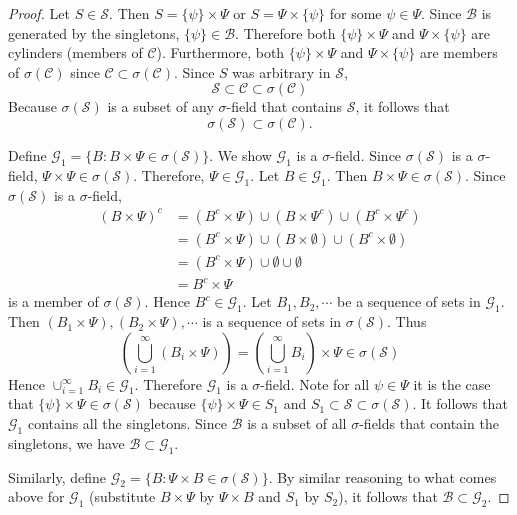 \documentclass[letterpaper, 12pt]{article}
\newcommand{\cB}{\mathcal{B}}
\newcommand{\cC}{\mathcal{C}}
\newcommand{\cG}{\mathcal{G}}
\newcommand{\cS}{\mathcal{S}}
\begin{document}
\begin{enumerate}
\begin{proof}
Let $S \in \cS$. Then $S = \{\psi\} \times \Psi$ or $S = \Psi \times \{\psi\}$ for some $\psi \in \Psi$. 
Since $\cB$ is generated by the singletons, $\{\psi\} \in \cB$. 
Therefore both $\{\psi\} \times \Psi$ and $\Psi \times \{\psi\}$ are cylinders (members of $\cC$).
Furthermore, both $\{\psi\} \times \Psi$ and $\Psi \times \{\psi\}$ are members of $\sigma(\cC)$ since $\cC \subset \sigma(\cC)$.
Since $S$ was arbitrary in $\cS$, 
\[
\cS \subset \cC \subset \sigma(\cC)
\]
Because $\sigma(\cS)$ is a subset of any $\sigma$-field that contains $\cS$, it follows that 
\[
\sigma(\cS) \subset \sigma(\cC).
\]

Define $\cG_1 = \{B : B \times \Psi \in \sigma(\cS)\}$. We show $\cG_1$ is a $\sigma$-field. Since $\sigma(\cS)$ is a $\sigma$-field, $\Psi \times \Psi \in \sigma(\cS)$. Therefore, $\Psi \in \cG_1$. 
Let $B \in \cG_1$. Then $B \times \Psi \in \sigma(\cS)$. Since $\sigma(\cS)$ is a $\sigma$-field,
\begin{align*}
(B \times \Psi)^c 
&= 
(B^c \times \Psi) 
\cup 
(B \times \Psi^c) 
\cup 
(B^c \times \Psi^c) 
\\
&= 
(B^c \times \Psi) 
\cup (B \times \emptyset) 
\cup 
(B^c \times \emptyset)
\\
&=
(B^c \times \Psi)
\cup
\emptyset
\cup
\emptyset
\\
&=
B^c \times \Psi
\end{align*}
is a member of $\sigma(\cS)$. Hence $B^c \in \cG_1$.
Let $B_1, B_2, \cdots$ be a sequence of sets in $\cG_1$. Then
$(B_1 \times \Psi), (B_2 \times \Psi), \cdots$
is a sequence of sets in $\sigma(\cS)$. Thus
\[
\left(
\bigcup_{i=1}^\infty (B_i \times \Psi)
\right)
=
\left(
\bigcup_{i=1}^\infty B_i 
\right)
\times \Psi
\in
\sigma(\cS)
\]
Hence $\cup_{i=1}^\infty B_i \in \cG_1$. Therefore $\cG_1$ is a $\sigma$-field. 
Note for all $\psi\in\Psi$ it is the case that $\{\psi\} \times \Psi \in \sigma(\cS)$ because $\{\psi\} \times \Psi \in S_1$ and $S_1 \subset \cS \subset \sigma(\cS)$. 
It follows that $\cG_1$ contains all the singletons. Since $\cB$ is a subset of all $\sigma$-fields that contain the singletons, we have $\cB \subset \cG_1$.

Similarly, define $\cG_2 = \{B : \Psi \times B \in \sigma(\cS)\}$. 
By similar reasoning to what comes above for $\cG_1$ (substitute $B \times \Psi$ by $\Psi \times B$ and $S_1$ by $S_2$), it follows that $\cB \subset \cG_2$.


\end{proof}
\end{enumerate}
\end{document}
